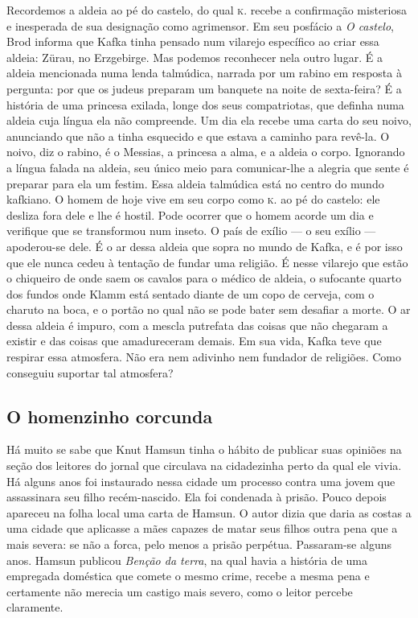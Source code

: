 Recordemos a aldeia ao pé do castelo, do qual \textsc{k.} recebe a confirmação
misteriosa e inesperada de sua designação como agrimensor. Em seu
posfácio a \textit{O castelo}, Brod informa que Kafka tinha pensado num
vilarejo específico ao criar essa aldeia: Zürau, no Erzgebirge. Mas
podemos reconhecer nela outro lugar. É a aldeia mencionada numa lenda
talmúdica, narrada por um rabino em resposta à pergunta: por que os
judeus preparam um banquete na noite de sexta-feira? É a história de uma
princesa exilada, longe dos seus compatriotas, que definha numa aldeia
cuja língua ela não compreende. Um dia ela recebe uma carta do seu
noivo, anunciando que não a tinha esquecido e que estava a caminho para
revê-la. O noivo, diz o rabino, é o Messias, a princesa a alma, e a
aldeia o corpo. Ignorando a língua falada na aldeia, seu único meio para
comunicar-lhe a alegria que sente é preparar para ela um festim. Essa
aldeia talmúdica está no centro do mundo kafkiano. O homem de hoje vive
em seu corpo como \textsc{k.} ao pé do castelo: ele desliza fora dele e lhe é
hostil. Pode ocorrer que o homem acorde um dia e verifique que se
transformou num inseto. O país de exílio --- o seu exílio ---
apoderou-se dele. É o ar dessa aldeia que sopra no mundo de Kafka, e é
por isso que ele nunca cedeu à tentação de fundar uma religião. É nesse
vilarejo que estão o chiqueiro de onde saem os cavalos para o médico de
aldeia, o sufocante quarto dos fundos onde Klamm está sentado diante de
um copo de cerveja, com o charuto na boca, e o portão no qual não se
pode bater sem desafiar a morte. O ar dessa aldeia é impuro, com a
mescla putrefata das coisas que não chegaram a existir e das coisas que
amadureceram demais. Em sua vida, Kafka teve que respirar essa
atmosfera. Não era nem adivinho nem fundador de religiões. Como
conseguiu suportar tal atmosfera?

\subsection{O homenzinho corcunda}

Há muito se sabe que Knut Hamsun tinha o hábito de publicar suas
opiniões na seção dos leitores do jornal que circulava na cidadezinha
perto da qual ele vivia. Há alguns anos foi instaurado nessa cidade um
processo contra uma jovem que assassinara seu filho recém-nascido. Ela
foi condenada à prisão. Pouco depois apareceu na folha local uma carta
de Hamsun. O autor dizia que daria as costas a uma cidade que aplicasse
a mães capazes de matar seus filhos outra pena que a mais severa: se não
a forca, pelo menos a prisão perpétua. Passaram-se alguns anos. Hamsun
publicou \textit{Benção da terra}, na qual havia a história de uma empregada
doméstica que comete o mesmo crime, recebe a mesma pena e certamente não
merecia um castigo mais severo, como o leitor percebe claramente.

